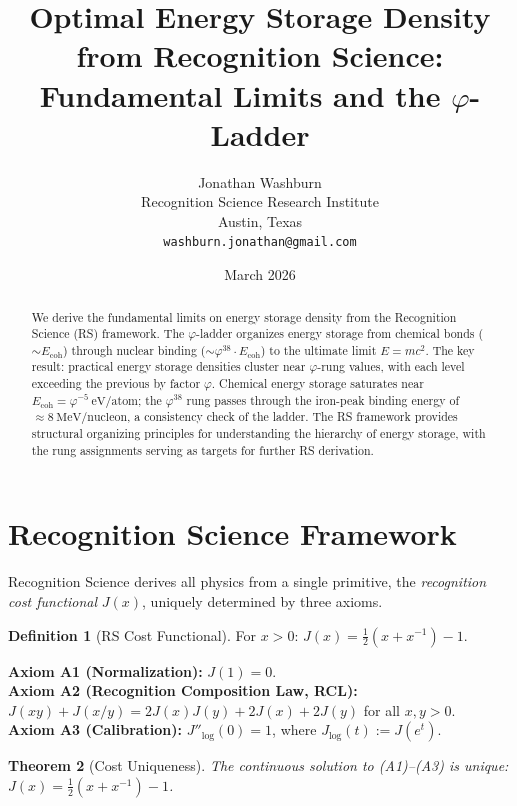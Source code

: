 \documentclass[12pt,a4paper]{article}
\title{Optimal Energy Storage Density from Recognition Science:\\
Fundamental Limits and the $\varphi$-Ladder}
\author{Jonathan Washburn\\
Recognition Science Research Institute\\
Austin, Texas\\
\texttt{washburn.jonathan@gmail.com}}
\date{March 2026}
\newtheorem{theorem}{Theorem}[section]
\theoremstyle{definition}
\newtheorem{definition}[theorem]{Definition}
\theoremstyle{remark}
\begin{document}
\maketitle

\begin{abstract}
We derive the fundamental limits on energy storage density from the Recognition Science (RS) 
framework. The $\varphi$-ladder organizes energy storage from chemical bonds ($\sim E_\mathrm{coh}$) 
through nuclear binding ($\sim \varphi^{38} \cdot E_\mathrm{coh}$) to the ultimate limit 
$E = mc^2$. The key result: practical energy storage densities cluster near
$\varphi$-rung values, with each level exceeding the previous by factor $\varphi$. 
Chemical energy storage saturates near $E_\mathrm{coh} = \varphi^{-5}~\mathrm{eV}/\mathrm{atom}$; 
the $\varphi^{38}$ rung passes through the iron-peak binding energy of
$\approx 8~\mathrm{MeV/nucleon}$, a consistency check of the ladder.
The RS framework provides structural organizing principles for understanding the hierarchy
of energy storage, with the rung assignments serving as targets for further RS derivation.
\end{abstract}

\section{Recognition Science Framework}
\label{sec:framework}

Recognition Science derives all physics from a single primitive,
the \emph{recognition cost functional} $J(x)$, uniquely determined
by three axioms.

\begin{definition}[RS Cost Functional]
For $x > 0$: $J(x) = \tfrac{1}{2}(x + x^{-1}) - 1$.
\end{definition}

\noindent\textbf{Axiom A1 (Normalization):} $J(1) = 0$.\\
\textbf{Axiom A2 (Recognition Composition Law, RCL):}
$J(xy) + J(x/y) = 2J(x)J(y) + 2J(x) + 2J(y)$ for all $x, y > 0$.\\
\textbf{Axiom A3 (Calibration):} $J''_{\log}(0) = 1$, where
$J_{\log}(t) := J(e^t)$.

\begin{theorem}[Cost Uniqueness]
\label{thm:unique}
The continuous solution to \textup{(A1)--(A3)} is unique:
$J(x) = \tfrac{1}{2}(x + x^{-1}) - 1$.
\end{theorem}
\end{document}
